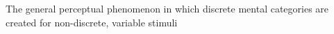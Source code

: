 The general perceptual phenomenon in which discrete mental categories are created for non-discrete, variable stimuli
